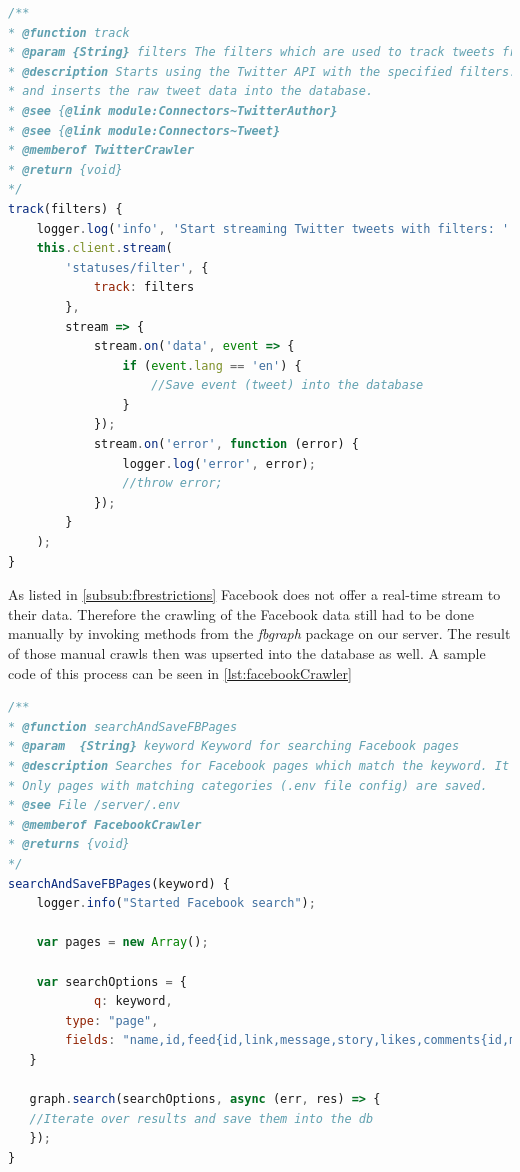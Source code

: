 \documentclass[11pt,titlepage,oneside,openany]{book}
\begin{document}
\begin{lstlisting}[caption={TwitterCrawler.track},captionpos=b,language=JavaScript,label={lst:twitterCrawler}]
/**
* @function track 
* @param {String} filters The filters which are used to track tweets from the Twitter API
* @description Starts using the Twitter API with the specified filters. When a new tweet is crawled it upserts the author data
* and inserts the raw tweet data into the database.
* @see {@link module:Connectors~TwitterAuthor}
* @see {@link module:Connectors~Tweet}
* @memberof TwitterCrawler
* @return {void}
*/
track(filters) {
    logger.log('info', 'Start streaming Twitter tweets with filters: ' + filters);
    this.client.stream(
        'statuses/filter', {
            track: filters
        },
        stream => {
            stream.on('data', event => {
                if (event.lang == 'en') {
                	//Save event (tweet) into the database
                }
            });
            stream.on('error', function (error) {
                logger.log('error', error);
                //throw error;
            });
        }
    );
}
\end{lstlisting}

As listed in \autoref{subsub:fbrestrictions} Facebook does not offer a real-time stream to their data. Therefore the crawling of the Facebook data still had to be done manually by invoking methods from the \textit{fbgraph} package on our server. The result of those manual crawls then was upserted into the database as well. A sample code of this process can be seen in \autoref{lst:facebookCrawler}

\begin{lstlisting}[caption={FacebookCrawler.searchAndSaveFBPages},captionpos=b,language=JavaScript,label={lst:facebookCrawler}]
 /**
* @function searchAndSaveFBPages
* @param  {String} keyword Keyword for searching Facebook pages
* @description Searches for Facebook pages which match the keyword. It also inserts the found pages and their posts and comments into the database. 
* Only pages with matching categories (.env file config) are saved.
* @see File /server/.env
* @memberof FacebookCrawler
* @returns {void} 
*/
searchAndSaveFBPages(keyword) {
	logger.info("Started Facebook search");

    var pages = new Array();

   	var searchOptions = {
    		q: keyword,
        type: "page",
        fields: "name,id,feed{id,link,message,story,likes,comments{id,message},created_time},category"
   }

   graph.search(searchOptions, async (err, res) => {
   //Iterate over results and save them into the db
   });
}
\end{lstlisting}
\end{document}
